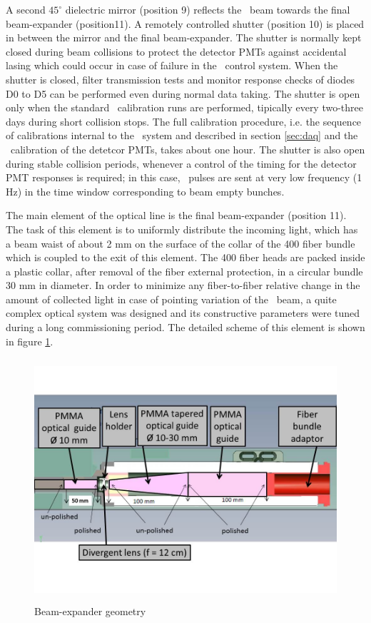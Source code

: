 A second $45^{\circ}$ dielectric mirror (position 9) reflects the \laser~beam towards
the final beam-expander (position11). A remotely controlled shutter (position 10) is
placed in between the mirror and the final beam-expander. The shutter is normally
kept closed during beam collisions to protect the detector PMTs against accidental
lasing which could occur in case of failure in the \laser~control system. When the
shutter is closed, filter transmission tests and monitor response checks of diodes
D0 to D5 can be performed even during normal data taking. The shutter is open only
when the standard \laser~calibration runs are performed, tipically every two-three
days during short collision stops. The full calibration procedure, i.e. the sequence
of calibrations internal to the \laser~system and described in section \ref{sec:daq} and the
\laser~calibration of the detetcor PMTs, takes about one hour. The shutter is also
open during stable collision periods, whenever a control of the timing for the
detector PMT responses is required; in this case, \laser~pulses are sent at very low
frequency (1 Hz) in the time window corresponding to
beam empty bunches. 

The main element of the optical line is the final beam-expander (position 11). The
task of this element is to uniformly distribute the incoming light, which has a
beam waist of about 2 mm on the surface of the collar of the 400 fiber bundle which
is coupled to the exit of this element. The 400 fiber heads are packed inside a
plastic collar, after removal of the fiber external protection, in a circular bundle
30 mm in diameter.  In order to minimize any fiber-to-fiber relative change in the
amount of collected light in case of pointing variation of the \laser~beam, a quite
complex optical system was designed and its constructive parameters were tuned
during a long commissioning period.  The detailed scheme of this element is shown in
figure \ref{fig:x.4}.
% 
\begin{figure}[htb]
\begin{center} 
\includegraphics[width=13cm, height=9cm]{figures/Beam_expander}
\caption{Beam-expander geometry
}\label{fig:x.4}
\end{center}
\end{figure}
%

